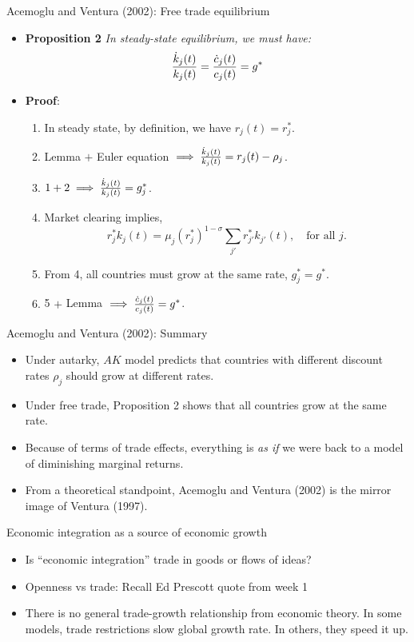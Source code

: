 \documentclass[10pt,notes=hide]{beamer}
\begin{document}
\begin{frame}{Acemoglu and Ventura (2002): Free trade equilibrium}
\begin{itemize}
\item {\bf Proposition 2} \emph{ In steady-state equilibrium, we must have:}
	\[
	{ \dot k_j(t) \over k_j(t) } = { \dot c_j(t) \over c_j(t) } = g^*
	\]
\item {\bf Proof}:
	\begin{enumerate}
	\item In steady state, by definition, we have $r_j(t) = r_j^*$.
	\item Lemma $+$ Euler equation $\implies { \dot k_j(t) \over k_j(t) } = r_j(t) - \rho_j$.
	\item $1 + 2 \implies {\dot k_j(t) \over k_j(t) } = g_j^*$.
	\item Market clearing implies,
		\[
		r_j^* k_j(t) = \mu_j(r^*_j)^{1-\sigma} \sum_{j'} r_{j'}^* k_{j'}(t), \quad\text{for all~}j.
		\]
	\item From 4, all countries must grow at the same rate, $g_j^* = g^*$.
	\item 5 $+$ Lemma $\implies {\dot c_j(t) \over c_j(t) } = g^*$.
	\end{enumerate}
\end{itemize}
\end{frame}
\begin{frame}{Acemoglu and Ventura (2002): Summary}
\begin{itemize}
\item Under autarky, $AK$ model predicts that countries with different discount rates $\rho_j$ should grow at different rates.
\item Under free trade, Proposition 2 shows that all countries grow at the same rate.
\item Because of terms of trade effects, everything is \emph{as if} we were back to a model of diminishing marginal returns.
\item From a theoretical standpoint, Acemoglu and Ventura (2002) is the mirror image of Ventura (1997).
\end{itemize}
\end{frame}
\begin{frame}{Economic integration as a source of economic growth}
\begin{itemize}
\item Is ``economic integration'' trade in goods or flows of ideas?
\item Openness vs trade: Recall Ed Prescott quote from week 1
\item There is no general trade-growth relationship from economic theory.
In some models, trade restrictions slow global growth rate.
In others, they speed it up.
\end{itemize}
\end{frame}
\end{document}
